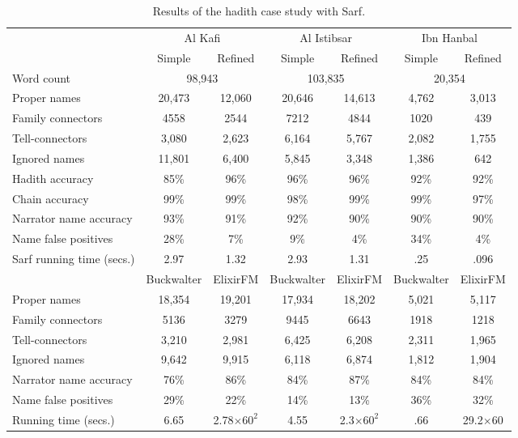 \begin{table}
\begin{minipage}{\textwidth}
 {
\begin{tabular}{lcccccc}
\hline \hline
 & \multicolumn{2}{c}{Al Kafi} & \multicolumn{2}{c}{Al Istibsar} &\multicolumn{2}{c}{Ibn Hanbal} \\ \cline{2-7}
 & Simple & Refined & Simple & Refined & Simple  & Refined \\ \hline
Word count &\multicolumn{2}{c}{98,943} & \multicolumn{2}{c}{103,835} & \multicolumn{2}{c}{20,354} \\ 
Proper names & 20,473 & 12,060 & 20,646 &  14,613 & 4,762 & 3,013\\
Family connectors & 4558 & 2544 & 7212 & 4844 & 1020 & 439 \\
Tell-connectors & 3,080 & 2,623 & 6,164 &  5,767 & 2,082 & 1,755 \\
Ignored names & 11,801 & 6,400 & 5,845 & 3,348 & 1,386 & 642 \\ \hline
Hadith accuracy & 85\% & 96\% & 96\%& 96\% & 92\%& 92\%\\ 
Chain accuracy & 99\% & 99\% & 98\% & 99\% & 99\% & 97\% \\ 
Narrator name accuracy & 93\% & 91\% &  92\% & 90\% & 90\% & 90\% \\ \hline
Name false positives & 28\% & 7\% & 9\%& 4\% & 34\% & 4\% \\ \hline
Sarf running time (secs.) & 2.97 & 1.32 & 2.93 & 1.31 & .25 & .096\\ \hline \hline
 & Buckwalter & ElixirFM & Buckwalter & ElixirFM & Buckwalter & ElixirFM \\ \hline
Proper names & 18,354 & 19,201 & 17,934 &  18,202 & 5,021 & 5,117 \\
Family connectors & 5136 & 3279 & 9445 & 6643 & 1918 & 1218 \\
Tell-connectors & 3,210 & 2,981 & 6,425 &  6,208 & 2,311 & 1,965 \\ 
Ignored names & 9,642 & 9,915 & 6,118 & 6,874 & 1,812 & 1,904 \\ \hline
Narrator name accuracy & 76\% & 86\% & 84\%& 87\% & 84\% & 84\% \\ \hline
Name false positives & 29\% & 22\% & 14\%& 13\% & 36\% & 32\% \\ \hline
Running time (secs.) & 6.65 & 2.78$\times60^2$ &4.55 & 2.3$\times60^2$ & .66 & 29.2$\times$60 \\
\hline \hline 
\end{tabular}
}
\end{minipage}
\caption{Results of the hadith case study with Sarf.}
\label{t:hadithresallresults}
\end{table}